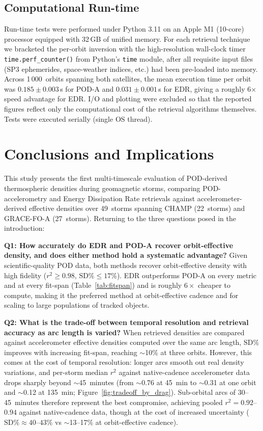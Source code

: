 \documentclass[draft]{agujournal2019}
\begin{document}
\subsection{Computational Run-time}
\label{sec:runtime}
Run-time tests were performed under Python 3.11 on an Apple M1 (10-core)
processor equipped with 32\,GB of unified memory. For each retrieval
technique we bracketed the per-orbit inversion with the high-resolution
wall-clock timer \texttt{time.perf\_counter()} from Python's \texttt{time}
module, after all requisite input files (SP3 ephemerides, space-weather
indices, etc.) had been pre-loaded into memory. Across
1\,000~orbits spanning both satellites, the mean execution time per orbit was
$0.185 \pm 0.003$\,s for POD-A and $0.031 \pm 0.001$\,s for EDR, giving a
roughly 6$\times$ speed advantage for EDR. I/O and plotting were excluded so
that the reported figures reflect only the computational cost of the retrieval
algorithms themselves. Tests were executed serially (single OS thread).

\section{Conclusions and Implications}

This study presents the first multi-timescale evaluation of POD-derived
thermospheric densities during geomagnetic storms, comparing POD-accelerometry
and Energy Dissipation Rate retrievals against accelerometer-derived effective
densities over 49~storms spanning CHAMP (22~storms) and GRACE-FO-A
(27~storms). Returning to the three questions posed in the introduction:

\textbf{Q1: How accurately do EDR and POD-A recover orbit-effective density, and does either method hold a systematic advantage?}
Given scientific-quality POD data, both methods recover orbit-effective
density with high fidelity ($r^{2} \geq 0.98$, $\text{SD\%} \leq 17\%$).
EDR outperforms POD-A on every metric and at every fit-span
(Table~\ref{tab:fitspan}) and is roughly $6\times$ cheaper to compute,
making it the preferred method at orbit-effective cadence and for scaling
to large populations of tracked objects.

\textbf{Q2: What is the trade-off between temporal resolution and retrieval accuracy as arc length is varied?}
When retrieved densities are compared against accelerometer effective
densities computed over the same arc length, $\text{SD\%}$ improves
with increasing fit-span, reaching $\sim$10\% at three orbits. However,
this comes at the cost of temporal resolution: longer arcs smooth out
real density variations, and per-storm median $r^{2}$ against native-cadence accelerometer
data drops sharply beyond $\sim$45~minutes (from $\sim$0.76 at 45~min
to $\sim$0.31 at one orbit and $\sim$0.12 at 135~min;
Figure~\ref{fig:tradeoff_by_drag}).
Sub-orbital arcs of 30--45~minutes therefore represent the best
compromise, achieving pooled $r^{2} = 0.92$--$0.94$ against native-cadence
data, though at the cost of increased uncertainty
($\text{SD\%} \approx 40$--$43\%$ vs $\sim$13--17\% at orbit-effective
cadence).
\end{document}
